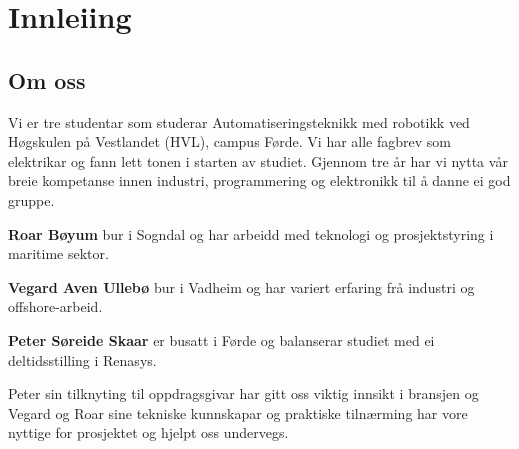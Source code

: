 \chapter{Innleiing}
\thispagestyle{fancy}

\section{Om oss}
Vi er tre studentar som studerar Automatiseringsteknikk med robotikk ved Høgskulen på Vestlandet (\gls{HVL}), campus Førde.
Vi har alle fagbrev som elektrikar og fann lett tonen i starten av studiet. \newline
Gjennom tre år har vi nytta vår breie kompetanse innen industri, programmering og elektronikk
til å danne ei god gruppe.

\textbf{Roar Bøyum} bur i Sogndal og har arbeidd med teknologi og prosjektstyring i maritime sektor.

\textbf{Vegard Aven Ullebø} bur i Vadheim og har variert erfaring frå industri og offshore-arbeid. 

\textbf{Peter Søreide Skaar} er busatt i Førde og balanserar studiet med ei deltidsstilling i Renasys. 

Peter sin tilknyting til oppdragsgivar har gitt oss viktig innsikt i bransjen og 
Vegard og Roar sine tekniske kunnskapar og praktiske tilnærming har vore nyttige for prosjektet og hjelpt oss undervegs.


\newpage


